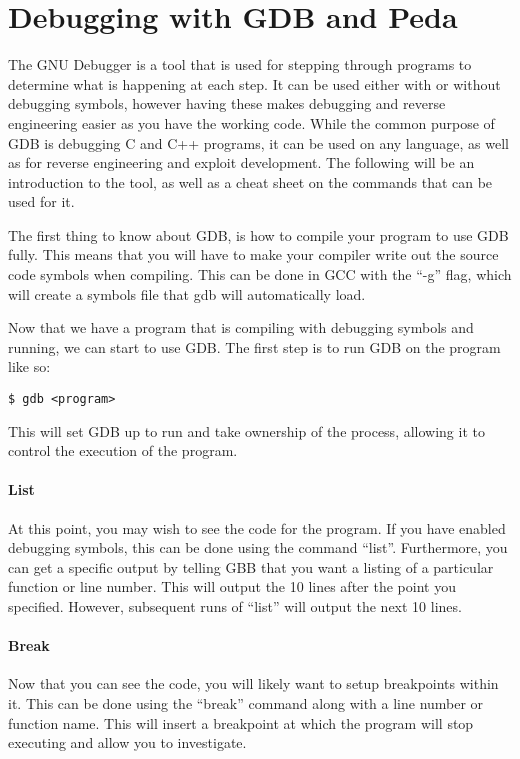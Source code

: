 	\section{Debugging with GDB and Peda}
		The GNU Debugger is a tool that is used for stepping through programs to determine what is happening at each step.
		It can be used either with or without debugging symbols,
		however having these makes debugging and reverse engineering easier as you have the working code.
		While the common purpose of GDB is debugging C and C++ programs, it can be used on any language, as well as for reverse engineering and exploit development.
		The following will be an introduction to the tool, as well as a cheat sheet on the commands that can be used for it.

		The first thing to know about GDB, is how to compile your program to use GDB fully.
		This means that you will have to make your compiler write out the source code symbols when compiling.
		This can be done in GCC with the ``-g'' flag, which will create a symbols file that gdb will automatically load.

		Now that we have a program that is compiling with debugging symbols and running, we can start to use GDB.
		The first step is to run GDB on the program like so:
		\begin{lstlisting}[style=CLI]
			$ gdb <program>
		\end{lstlisting}
		This will set GDB up to run and take ownership of the process, allowing it to control the execution of the program.

		\paragraph{List}
		At this point, you may wish to see the code for the program.
		If you have enabled debugging symbols, this can be done using the command ``list''.
		Furthermore, you can get a specific output by telling GBB that you want a listing of a particular function or line number.
		This will output the 10 lines after the point you specified.
		However, subsequent runs of ``list'' will output the next 10 lines.

		\paragraph{Break}
		Now that you can see the code, you will likely want to setup breakpoints within it.
		This can be done using the ``break'' command along with a line number or function name.
		This will insert a breakpoint at which the program will stop executing and allow you to investigate.

